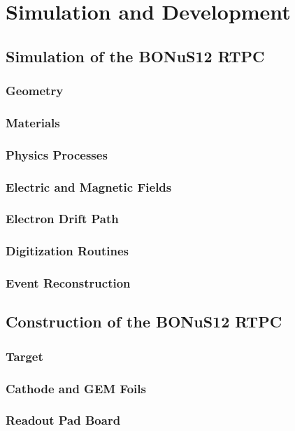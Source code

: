 \chapter{Simulation and Development}
\label{ch:simdev}

\section{Simulation of the BONuS12 RTPC}
\subsection{Geometry}
\subsection{Materials}
\subsection{Physics Processes}
\subsection{Electric and Magnetic Fields}
\subsection{Electron Drift Path}
\subsection{Digitization Routines}
\subsection{Event Reconstruction}

\section{Construction of the BONuS12 RTPC}
\subsection{Target}
\subsection{Cathode and GEM Foils}
\subsection{Readout Pad Board}
